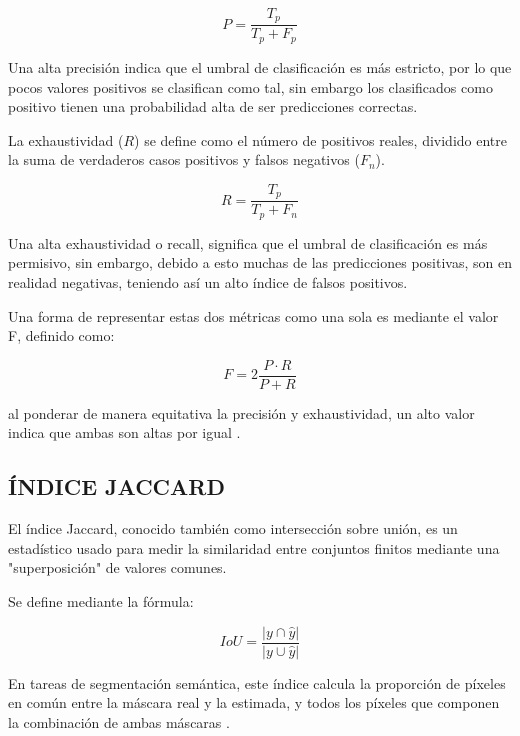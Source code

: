 \begin{equation}
	P = \frac{T_p}{T_p + F_p}
\end{equation}

Una alta precisión indica que el umbral de clasificación es más estricto, por lo que pocos valores positivos se clasifican como tal, sin embargo los clasificados como positivo tienen una probabilidad alta de ser predicciones correctas.

La exhaustividad ($R$) se define como el número de positivos reales, dividido entre la suma de verdaderos casos positivos y falsos negativos ($F_n$).

\begin{equation}
	R = \frac{T_p}{T_p + F_n}
\end{equation}

Una alta exhaustividad o recall, significa que el umbral de clasificación es más permisivo, sin embargo, debido a esto muchas de las predicciones positivas, son en realidad negativas, teniendo así un alto índice de falsos positivos.

Una forma de representar estas dos métricas como una sola es mediante el valor F, definido como:

\begin{equation}
	F = 2\frac{P\cdot R}{P+R}
\end{equation}

al ponderar de manera equitativa la precisión y exhaustividad, un alto valor indica que ambas son altas por igual \citep{bishop}.

\subsection{ÍNDICE JACCARD}
El índice Jaccard, conocido también como intersección sobre unión, es un estadístico usado para medir la similaridad entre conjuntos finitos mediante una "superposición" de valores comunes.

Se define mediante la fórmula:

\begin{equation}
	IoU = \frac{|y\cap\hat{y}|}{|y\cup\hat{y}|}
\end{equation}

En tareas de segmentación semántica, este índice calcula la proporción de píxeles en común entre la máscara real y la estimada, y todos los píxeles que componen la combinación de ambas máscaras \citep{Goodfellow-et-al-2016}.